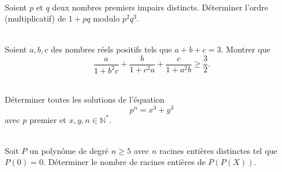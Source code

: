 \begin{exo}\\
Soient $p$ et $q$ deux nombres premiers impairs distincts. Déterminer l'ordre (multiplicatif) de $1+pq$ modulo $p^2 q^3$.
\end{exo}

\bigskip

\begin{exo}\\
Soient $a,b,c$ des nombres r\'eels positifs tels que $a+b+c=3$. Montrer que
$$\frac{a}{1+b^2c}+\frac{b}{1+c^2a}+\frac{c}{1+a^2b}\geqslant \frac{3}{2}.$$
\end{exo}

\bigskip

\begin{exo}\\
Déterminer toutes les solutions de l'équation
\[p^n=x^3+y^3\]
avec $p$ premier et $x,y,n \in \mathbb{N}^*$.
\end{exo}

\bigskip

\begin{exo}\\
Soit $P$ un polynôme de degré $n \geq 5$ avec $n$ racines entières distinctes tel que $P(0)=0$. Déterminer le nombre de racines entières de $P(P(X))$.
\end{exo}
